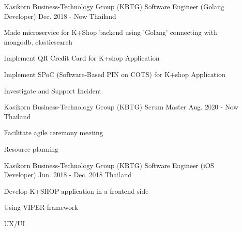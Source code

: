 

\begin{cventries}

  \cventry
    {Kasikorn Business-Technology Group (KBTG)} %
    {Software Engineer (Golang Developer)} %
    {Dec. 2018 - Now} %
    {Thailand} %
    {
      \begin{cvitems} %
        \item {Made microservice for K+Shop backend using 'Golang' connecting with mongodb, elasticsearch}
        \item {Implement QR Credit Card for K+shop Application}
        \item {Implement SPoC (Software-Based PIN on COTS) for K+shop Application}
        \item {Investigate and Support Incident}
      \end{cvitems}
    }

  \cventry
    {Kasikorn Business-Technology Group (KBTG)} %
    {Scrum Master} %
    {Aug. 2020 - Now} %
    {Thailand} %
  {
    \begin{cvitems} %
      \item {Facilitate agile ceremony meeting} %
      \item {Resource planning}
    \end{cvitems}
  }

  \cventry
    {Kasikorn Business-Technology Group (KBTG)} %
    {Software Engineer (iOS Developer)} %
    {Jun. 2018 - Dec. 2018} %
    {Thailand} %
    {
      \begin{cvitems} %
        \item {Develop K+SHOP application in a frontend side}
        \item {Using VIPER framework}
        \item {UX/UI}
      \end{cvitems}
    }


\end{cventries}
